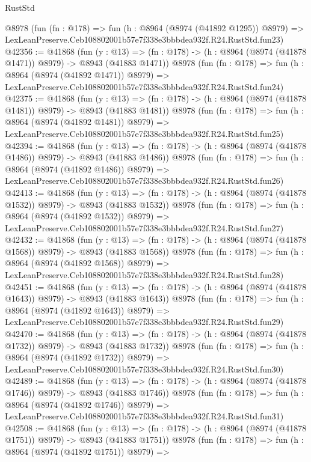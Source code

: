 \begin{lexlean}{RustStd}
\begin{coremodule}
    @8978
    (fun (fn : @178) =>
    fun (h : @8964 (@8974 (@41892 @1295)) @8979) =>
    LexLeanPreserve.Ceb108802001b57e7f338e3bbbdea932f.R24.RustStd.fun23)
@42356 := @41868
    (fun (y : @13) =>
    (fn : @178) -> (h : @8964 (@8974 (@41878 @1471)) @8979) -> @8943 (@41883 @1471))
    @8978
    (fun (fn : @178) =>
    fun (h : @8964 (@8974 (@41892 @1471)) @8979) =>
    LexLeanPreserve.Ceb108802001b57e7f338e3bbbdea932f.R24.RustStd.fun24)
@42375 := @41868
    (fun (y : @13) =>
    (fn : @178) -> (h : @8964 (@8974 (@41878 @1481)) @8979) -> @8943 (@41883 @1481))
    @8978
    (fun (fn : @178) =>
    fun (h : @8964 (@8974 (@41892 @1481)) @8979) =>
    LexLeanPreserve.Ceb108802001b57e7f338e3bbbdea932f.R24.RustStd.fun25)
@42394 := @41868
    (fun (y : @13) =>
    (fn : @178) -> (h : @8964 (@8974 (@41878 @1486)) @8979) -> @8943 (@41883 @1486))
    @8978
    (fun (fn : @178) =>
    fun (h : @8964 (@8974 (@41892 @1486)) @8979) =>
    LexLeanPreserve.Ceb108802001b57e7f338e3bbbdea932f.R24.RustStd.fun26)
@42413 := @41868
    (fun (y : @13) =>
    (fn : @178) -> (h : @8964 (@8974 (@41878 @1532)) @8979) -> @8943 (@41883 @1532))
    @8978
    (fun (fn : @178) =>
    fun (h : @8964 (@8974 (@41892 @1532)) @8979) =>
    LexLeanPreserve.Ceb108802001b57e7f338e3bbbdea932f.R24.RustStd.fun27)
@42432 := @41868
    (fun (y : @13) =>
    (fn : @178) -> (h : @8964 (@8974 (@41878 @1568)) @8979) -> @8943 (@41883 @1568))
    @8978
    (fun (fn : @178) =>
    fun (h : @8964 (@8974 (@41892 @1568)) @8979) =>
    LexLeanPreserve.Ceb108802001b57e7f338e3bbbdea932f.R24.RustStd.fun28)
@42451 := @41868
    (fun (y : @13) =>
    (fn : @178) -> (h : @8964 (@8974 (@41878 @1643)) @8979) -> @8943 (@41883 @1643))
    @8978
    (fun (fn : @178) =>
    fun (h : @8964 (@8974 (@41892 @1643)) @8979) =>
    LexLeanPreserve.Ceb108802001b57e7f338e3bbbdea932f.R24.RustStd.fun29)
@42470 := @41868
    (fun (y : @13) =>
    (fn : @178) -> (h : @8964 (@8974 (@41878 @1732)) @8979) -> @8943 (@41883 @1732))
    @8978
    (fun (fn : @178) =>
    fun (h : @8964 (@8974 (@41892 @1732)) @8979) =>
    LexLeanPreserve.Ceb108802001b57e7f338e3bbbdea932f.R24.RustStd.fun30)
@42489 := @41868
    (fun (y : @13) =>
    (fn : @178) -> (h : @8964 (@8974 (@41878 @1746)) @8979) -> @8943 (@41883 @1746))
    @8978
    (fun (fn : @178) =>
    fun (h : @8964 (@8974 (@41892 @1746)) @8979) =>
    LexLeanPreserve.Ceb108802001b57e7f338e3bbbdea932f.R24.RustStd.fun31)
@42508 := @41868
    (fun (y : @13) =>
    (fn : @178) -> (h : @8964 (@8974 (@41878 @1751)) @8979) -> @8943 (@41883 @1751))
    @8978
    (fun (fn : @178) =>
    fun (h : @8964 (@8974 (@41892 @1751)) @8979) =>

\end{coremodule}
\end{lexlean}
